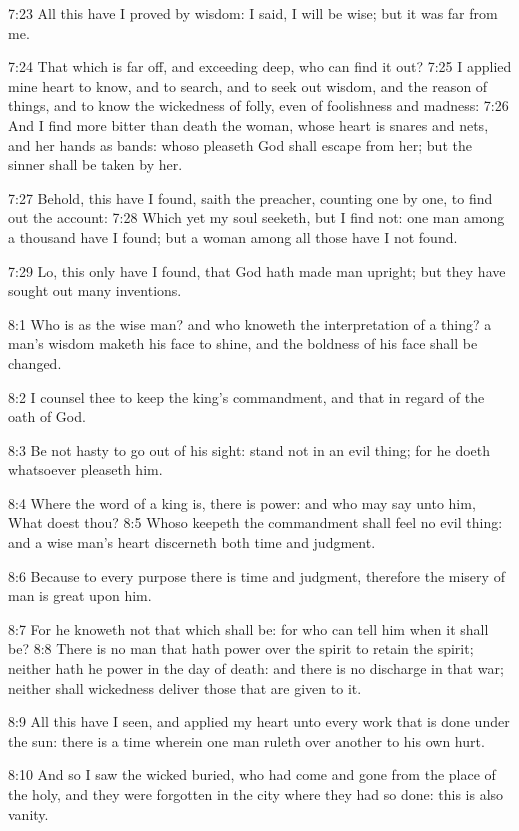7:23 All this have I proved by wisdom: I said, I will be wise; but it
was far from me.

7:24 That which is far off, and exceeding deep, who can find it out?
7:25 I applied mine heart to know, and to search, and to seek out
wisdom, and the reason of things, and to know the wickedness of folly,
even of foolishness and madness: 7:26 And I find more bitter than
death the woman, whose heart is snares and nets, and her hands as
bands: whoso pleaseth God shall escape from her; but the sinner shall
be taken by her.

7:27 Behold, this have I found, saith the preacher, counting one by
one, to find out the account: 7:28 Which yet my soul seeketh, but I
find not: one man among a thousand have I found; but a woman among all
those have I not found.

7:29 Lo, this only have I found, that God hath made man upright; but
they have sought out many inventions.

8:1 Who is as the wise man? and who knoweth the interpretation of a
thing?  a man's wisdom maketh his face to shine, and the boldness of
his face shall be changed.

8:2 I counsel thee to keep the king's commandment, and that in regard
of the oath of God.

8:3 Be not hasty to go out of his sight: stand not in an evil thing;
for he doeth whatsoever pleaseth him.

8:4 Where the word of a king is, there is power: and who may say unto
him, What doest thou?  8:5 Whoso keepeth the commandment shall feel no
evil thing: and a wise man's heart discerneth both time and judgment.

8:6 Because to every purpose there is time and judgment, therefore the
misery of man is great upon him.

8:7 For he knoweth not that which shall be: for who can tell him when
it shall be?  8:8 There is no man that hath power over the spirit to
retain the spirit; neither hath he power in the day of death: and
there is no discharge in that war; neither shall wickedness deliver
those that are given to it.

8:9 All this have I seen, and applied my heart unto every work that is
done under the sun: there is a time wherein one man ruleth over
another to his own hurt.

8:10 And so I saw the wicked buried, who had come and gone from the
place of the holy, and they were forgotten in the city where they had
so done: this is also vanity.

